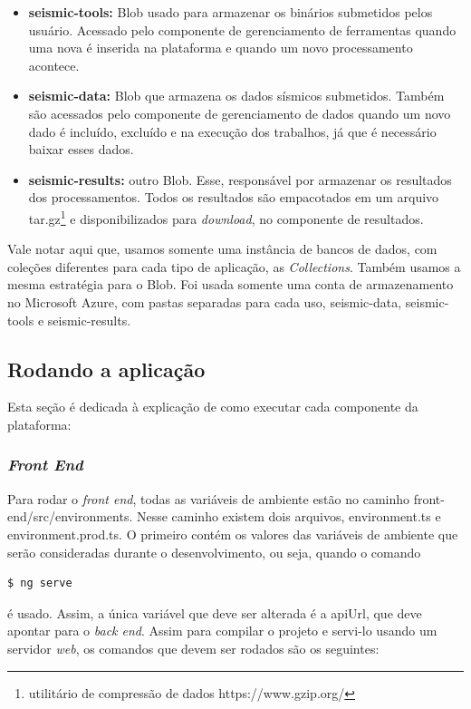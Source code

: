 \documentclass[11pt,twoside]{article}
\begin{document}
\begin{itemize}
  \item \textbf{seismic-tools:} Blob usado para armazenar os binários submetidos pelos usuário. Acessado pelo componente de gerenciamento de ferramentas quando uma nova é inserida na plataforma 
  e quando um novo processamento acontece.
  \item \textbf{seismic-data:} Blob que armazena os dados sísmicos submetidos. Também são acessados pelo componente de gerenciamento de dados quando um novo dado é incluído, excluído e na execução dos 
  trabalhos, já que é necessário baixar esses dados.
  \item \textbf{seismic-results:} outro Blob. Esse, responsável por armazenar os resultados dos processamentos. Todos os resultados são empacotados em um arquivo tar.gz\footnote{ utilitário de compressão de dados https://www.gzip.org/} e disponibilizados para \emph{download}, 
  no componente de resultados.
\end{itemize}

Vale notar aqui que, usamos somente uma instância de bancos de dados, com coleções diferentes para cada tipo de aplicação, as \emph{Collections}. Também usamos a mesma estratégia para o Blob. Foi usada somente 
uma conta de armazenamento no Microsoft Azure, com pastas separadas para cada uso, seismic-data, seismic-tools e seismic-results. 

\subsection{Rodando a aplicação}

Esta seção é dedicada à explicação de como executar cada componente da plataforma:

\subsubsection{\emph{Front End}}

Para rodar o \emph{front end}, todas as variáveis de ambiente estão no caminho front-end/src/environments. Nesse caminho existem dois arquivos, environment.ts e environment.prod.ts.
O primeiro contém os valores das variáveis de ambiente que serão consideradas durante o desenvolvimento, ou seja, quando o comando

\begin{lstlisting}[language=bash]
  $ ng serve 
\end{lstlisting}

é usado. Assim, a única variável que deve ser alterada é a apiUrl, que deve apontar para o \emph{back end}. Assim para compilar o projeto e servi-lo usando um servidor \emph{web}, os comandos que 
devem ser rodados são os seguintes: 
\end{document}

